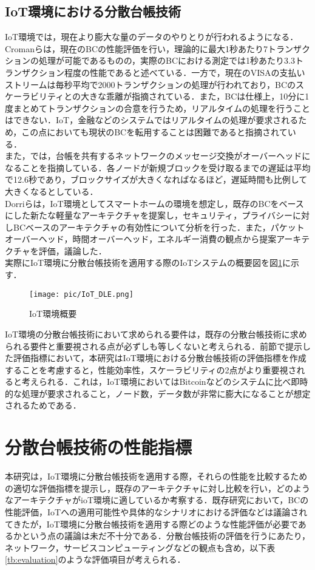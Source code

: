\documentclass[japanese, macos]{KU2}
\begin{document}
\section{IoT環境における分散台帳技術}
IoT環境では，現在より膨大な量のデータのやりとりが行われるようになる．Cromanらは，現在のBCの性能評価を行い，理論的に最大1秒あたり7トランザクションの処理が可能であるものの，実際のBCにおける測定では1秒あたり3.3トランザクション程度の性能であると述べている\cite{croman2016scaling}．一方で，現在のVISAの支払いストリームは毎秒平均で2000トランザクションの処理が行われており，BCのスケーラビリティとの大きな乖離が指摘されている．また，BCは仕様上，10分に1度まとめてトランザクションの合意を行うため，リアルタイムの処理を行うことはできない．IoT，金融などのシステムではリアルタイムの処理が要求されるため，この点においても現状のBCを転用することは困難であると指摘されている．\\
また，\cite{decker2013information}では，台帳を共有するネットワークのメッセージ交換がオーバーヘッドになることを指摘している．各ノードが新規ブロックを受け取るまでの遅延は平均で12.6秒であり，ブロックサイズが大きくなればなるほど，遅延時間も比例して大きくなるとしている．\\
Dorriらは，IoT環境としてスマートホームの環境を想定し，既存のBCをベースにした新たな軽量なアーキテクチャを提案し，セキュリティ，プライバシーに対しBCベースのアーキテクチャの有効性について分析を行った\cite{dorri2017blockchain}．また，パケットオーバーヘッド，時間オーバーヘッド，エネルギー消費の観点から提案アーキテクチャを評価，議論した．\\
実際にIoT環境に分散台帳技術を適用する際のIoTシステムの概要図を図\ref{fig:IoT_DLE}に示す．

\begin{figure}[htbp]
  \begin{center} 
    \texttt{[image: pic/IoT\_DLE.png]}
    \caption{IoT環境概要}
    \label{fig:IoT_DLE} 
  \end{center}
\end{figure}


IoT環境の分散台帳技術において求められる要件は，既存の分散台帳技術に求められる要件と重要視される点が必ずしも等しくないと考えられる．前節で提示した評価指標において，本研究はIoT環境における分散台帳技術の評価指標を作成することを考慮すると，性能効率性，スケーラビリティの2点がより重要視されると考えられる．これは，IoT環境においてはBitcoinなどのシステムに比べ即時的な処理が要求されること，ノード数，データ数が非常に膨大になることが想定されるためである．


\chapter{分散台帳技術の性能指標}
本研究は，IoT環境に分散台帳技術を適用する際，それらの性能を比較するための適切な評価指標を提示し，既存のアーキテクチャに対し比較を行い，どのようなアーキテクチャがioT環境に適しているか考察する．既存研究において，BCの性能評価，IoTへの適用可能性や具体的なシナリオにおける評価などは議論されてきたが，IoT環境に分散台帳技術を適用する際どのような性能評価が必要であるかという点の議論は未だ不十分である．分散台帳技術の評価を行うにあたり，ネットワーク，サービスコンピューティングなどの観点も含め，以下表\ref{tb:evaluation}のような評価項目が考えられる．
\end{document}
